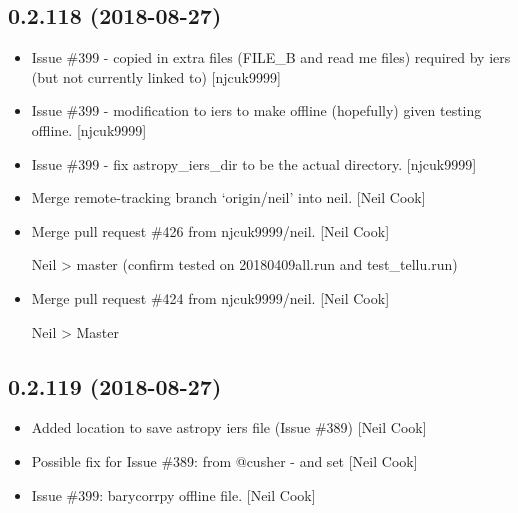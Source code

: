 \documentclass[a4paper,10pt,english]{report}
\begin{document}
\subsection{0.2.118 (2018-08-27)}
\label{\detokenize{misc/changelog:id347}}\begin{itemize}
\item {} 
Issue \#399 - copied in extra files (FILE\_B and read me files) required
by iers (but not currently linked to) {[}njcuk9999{]}

\item {} 
Issue \#399 - modification to iers to make offline (hopefully) given
testing offline. {[}njcuk9999{]}

\item {} 
Issue \#399 - fix astropy\_iers\_dir to be the actual directory.
{[}njcuk9999{]}

\item {} 
Merge remote-tracking branch ‘origin/neil’ into neil. {[}Neil Cook{]}

\item {} 
Merge pull request \#426 from njcuk9999/neil. {[}Neil Cook{]}

Neil \textendash{}\textgreater{} master (confirm tested on 20180409all.run and test\_tellu.run)

\item {} 
Merge pull request \#424 from njcuk9999/neil. {[}Neil Cook{]}

Neil \textendash{}\textgreater{} Master

\end{itemize}


\subsection{0.2.119 (2018-08-27)}
\label{\detokenize{misc/changelog:id348}}\begin{itemize}
\item {} 
Added location to save astropy iers file (Issue \#389) {[}Neil Cook{]}

\item {} 
Possible fix for Issue \#389: from @cusher -  and set  {[}Neil Cook{]}

\item {} 
Issue \#399: barycorrpy offline file. {[}Neil Cook{]}

\end{itemize}
\end{document}
